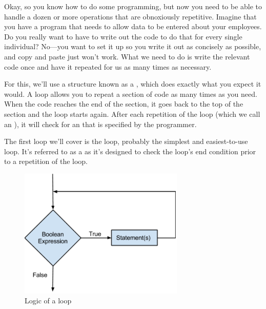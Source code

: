 

Okay, so you know how to do some programming, but now you need to be able to handle a dozen or more operations that are obnoxiously repetitive.
Imagine that you have a program that needs to allow data to be entered about your employees.
Do you really want to have to write out the code to do that for every single individual?
No---you want to set it up so you write it out as concisely as possible, and copy and paste just won't work.
What we need to do is write the relevant code once and have it repeated for us as many times as necessary.

For this, we'll use a structure known as a , which does exactly what you expect it would.
A loop allows you to repeat a section of code as many times as you need.
When the code reaches the end of the section, it goes back to the top of the section and the loop starts again.
After each repetition of the loop (which we call an ), it will check for an  that is specified by the programmer. 


The first loop we'll cover is the  loop, probably the simplest and easiest-to-use loop.
It's referred to as a  as it's designed to check the loop's end condition prior to a repetition of the loop.

\begin{figure}[tbh]
  \centering
  \includegraphics[width=0.7\textwidth]{diagrams/while_logic.pdf}
  \caption{Logic of a  loop} \label{fig-while-logic} 
\end{figure}

